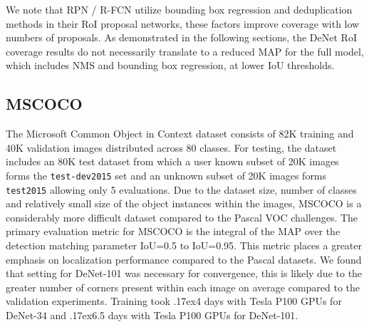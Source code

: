 \documentclass[10pt,twocolumn]{article}
\newcommand\approxtilde{\raise.17ex\hbox{}}
\begin{document}
We note that RPN / R-FCN utilize bounding box regression and deduplication methods in their RoI proposal networks, these factors improve coverage with low numbers of proposals. As demonstrated in the following sections, the DeNet RoI coverage results do not necessarily translate to a reduced MAP for the full model, which includes NMS and bounding box regression, at lower IoU thresholds.  

\subsection{MSCOCO} The Microsoft Common Object in Context\cite{mscoco} dataset consists of 82K training and 40K validation images distributed across 80 classes. For testing, the dataset includes an 80K test dataset from which a user known subset of 20K images forms the \texttt{test-dev2015} set and an unknown subset of 20K images forms \texttt{test2015} allowing only 5 evaluations. Due to the dataset size, number of classes and relatively small size of the object instances within the images, MSCOCO is a considerably more difficult dataset compared to the Pascal VOC challenges. The primary evaluation metric for MSCOCO is the integral of the MAP over the detection matching parameter IoU=0.5 to IoU=0.95. This metric places a greater emphasis on localization performance compared to the Pascal datasets. We found that setting  for DeNet-101 was necessary for convergence, this is likely due to the greater number of corners present within each image on average compared to the validation experiments. Training took \approxtilde 4 days with  Tesla P100 GPUs for DeNet-34 and \approxtilde 6.5 days with  Tesla P100 GPUs for DeNet-101.
\end{document}
